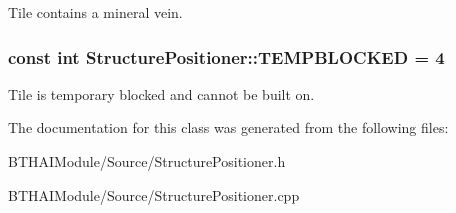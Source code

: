 Tile contains a mineral vein. \hypertarget{class_structure_positioner_ad08ca89033039a7d467a5d2865328d84}{
\subsubsection[{T\-E\-M\-P\-B\-L\-O\-C\-K\-E\-D}]{\setlength{\rightskip}{0pt plus 5cm}const int Structure\-Positioner\-::\-T\-E\-M\-P\-B\-L\-O\-C\-K\-E\-D = 4\hspace{0.3cm}{\ttfamily [static]}}}\label{class_structure_positioner_ad08ca89033039a7d467a5d2865328d84}
Tile is temporary blocked and cannot be built on. 

The documentation for this class was generated from the following files\-:\begin{DoxyCompactItemize}
\item 
B\-T\-H\-A\-I\-Module/\-Source/Structure\-Positioner.\-h\item 
B\-T\-H\-A\-I\-Module/\-Source/Structure\-Positioner.\-cpp\end{DoxyCompactItemize}

